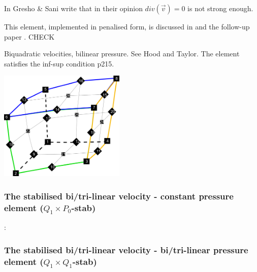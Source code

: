 \begin{minipage}[t]{0.5\textwidth}

\end{minipage}
\begin{minipage}[t]{0.5\textwidth}

\end{minipage}


In \cite{grsa} Gresho \& Sani write that in their opinion $div(\vec v)=0$ is not strong enough.

This element, implemented in penalised form, is discussed in \cite{been79} and the follow-up paper \cite{been80}. CHECK

Biquadratic velocities, bilinear pressure. See Hood and Taylor. The element satisfies the inf-sup condition \cite{hugh}p215. 

\begin{center}
\includegraphics[width=6cm]{images/q2q1/q2numering}
\end{center}

\subsubsection{The stabilised bi/tri-linear velocity -  constant pressure element ($Q_1\times P_0$-stab)}

\Literature: \cite{sike90,vibo92,kesi92,qizh07,lisi12,chco01,chri02}

\subsubsection{The stabilised bi/tri-linear velocity -  bi/tri-linear pressure element ($Q_1\times Q_1$-stab)}

\begin{minipage}[t]{0.5\textwidth}

\end{minipage}
\begin{minipage}[t]{0.5\textwidth}

\end{minipage}

